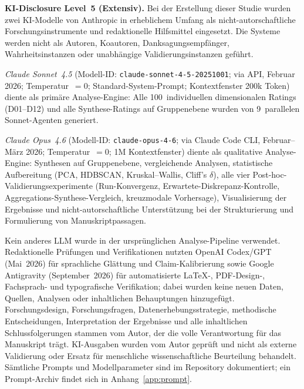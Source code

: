 \documentclass[12pt,a4paper]{article}
\begin{document}
\begingroup
\small
{}
\setlength{\parskip}{0pt}\sloppy
\smallskip
{}

\noindent\textbf{KI-Disclosure Level~5 (Extensiv).}
Bei der Erstellung dieser Studie wurden zwei KI-Modelle von Anthropic in erheblichem Umfang als nicht-autorschaftliche Forschungsinstrumente und redaktionelle Hilfsmittel eingesetzt. Die Systeme werden nicht als Autoren, Koautoren, Danksagungsempfänger, Wahrheitsinstanzen oder unabhängige Validierungsinstanzen geführt.

\emph{Claude Sonnet~4.5} (Modell-ID: \texttt{claude-sonnet-4-5-20251001}; via API, Februar 2026; Temperatur~$= 0$; Standard-System-Prompt; Kontextfenster 200k Token) diente als primäre Analyse-Engine: Alle 100~individuellen dimensionalen Ratings (D01--D12) und alle Synthese-Ratings auf Gruppenebene wurden von 9~parallelen Sonnet-Agenten generiert.

\emph{Claude Opus~4.6} (Modell-ID: \texttt{claude-opus-4-6}; via Claude Code CLI, Februar--März 2026; Temperatur~$= 0$; 1M Kontextfenster) diente als qualitative Analyse-Engine: Synthesen auf Gruppenebene, vergleichende Analysen, statistische Aufbereitung (PCA, HDBSCAN, Kruskal--Wallis, Cliff's $\delta$), alle vier Post-hoc-Validierungsexperimente (Run-Konvergenz, Erwartete-Diskrepanz-Kontrolle, Aggregations-Synthese-Vergleich, kreuzmodale Vorhersage), Visualisierung der Ergebnisse und nicht-autorschaftliche Unterstützung bei der Strukturierung und Formulierung von Manuskriptpassagen.

Kein anderes LLM wurde in der ursprünglichen Analyse-Pipeline verwendet. Redaktionelle Prüfungen und Verifikationen nutzten OpenAI Codex/GPT (Mai~2026) für sprachliche Glättung und Claim-Kalibrierung sowie Google Antigravity (September~2026) für automatisierte LaTeX-, PDF-Design-, Fachsprach- und typografische Verifikation; dabei wurden keine neuen Daten, Quellen, Analysen oder inhaltlichen Behauptungen hinzugefügt. Forschungsdesign, Forschungsfragen, Datenerhebungsstrategie, methodische Entscheidungen, Interpretation der Ergebnisse und alle inhaltlichen Schlussfolgerungen stammen vom Autor, der die volle Verantwortung für das Manuskript trägt. KI-Ausgaben wurden vom Autor geprüft und nicht als externe Validierung oder Ersatz für menschliche wissenschaftliche Beurteilung behandelt. Sämtliche Prompts und Modellparameter sind im Repository dokumentiert; ein Prompt-Archiv findet sich in Anhang~\ref{app:prompt}.
\end{document}
